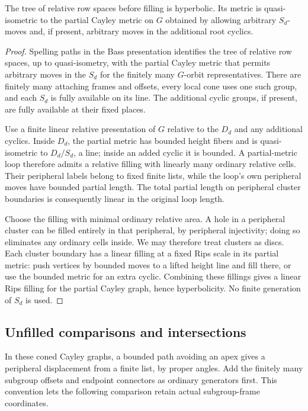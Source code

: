 \begin{lemma}\label{transfer:partial-hyperbolicity}
The tree of relative row spaces before filling is hyperbolic. Its metric is quasi-isometric to the partial Cayley metric on \(G\) obtained by allowing arbitrary \(S_d\)-moves and, if present, arbitrary moves in the additional root cyclics.
\end{lemma}
\begin{proof}
Spelling paths in the Bass presentation identifies the tree of
relative row spaces, up to quasi-isometry, with the partial Cayley
metric that permits arbitrary moves in the $S_d$ for the finitely
many $G$-orbit representatives. There are finitely many attaching
frames and offsets, every local cone uses one such group, and each
$S_d$ is fully available on its line. The additional cyclic groups,
if present, are fully available at their fixed places.

Use a finite linear relative presentation of $G$ relative to the
$D_d$ and any additional cyclics. Inside $D_d$, the partial metric
has bounded height fibers and is quasi-isometric to $D_d/S_d$, a
line; inside an added cyclic it is bounded. A partial-metric loop
therefore admits a relative filling with linearly many ordinary
relative cells. Their peripheral labels belong to fixed finite
lists, while the loop's own peripheral moves have bounded partial
length. The total partial length on peripheral cluster boundaries
is consequently linear in the original loop length.

Choose the filling with minimal ordinary relative area. A hole in
a peripheral cluster can be filled entirely in that peripheral,
by peripheral injectivity; doing so eliminates any ordinary cells
inside. We may therefore treat clusters as discs. Each cluster
boundary has a linear filling at a fixed Rips scale in its partial
metric: push vertices by bounded moves to a lifted height line and
fill there, or use the bounded metric for an extra cyclic. Combining
these fillings gives a linear Rips filling for the partial Cayley
graph, hence hyperbolicity. No finite generation of $S_d$ is used.
\end{proof}

\subsection{Unfilled comparisons and intersections}

In these coned Cayley graphs, a bounded path avoiding an apex gives
a peripheral displacement from a finite list, by proper angles.
Add the finitely many subgroup offsets and endpoint connectors as
ordinary generators first. This convention lets the following
comparison retain actual subgroup-frame coordinates.


